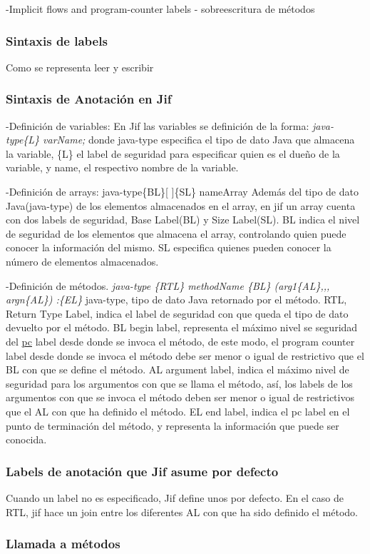 -Implicit flows and program-counter labels\newline
- sobreescritura de métodos

\subsubsection{Sintaxis de labels}
Como se representa leer y escribir

\subsubsection{Sintaxis de Anotación en Jif}
\label{subsec:JifSintax}

-Definición de variables: \newline 
En Jif las variables se definición de la forma: 
\emph{ java-type\{L\} varName; }\newline 
donde java-type especifica el tipo de dato Java que
almacena la variable, \{L\} el label de seguridad  para especificar quien es el
dueño de la variable, y name, el respectivo nombre de la variable.

-Definición de arrays:\newline
java-type\{BL\}[ ]\{SL\} nameArray\newline
Además del tipo de dato Java(java-type) de los elementos almacenados en el
array,  en jif un array cuenta con dos labels de seguridad, Base Label(BL) y
Size Label(SL). BL indica el nivel de seguridad de los elementos que almacena el
array, controlando quien puede conocer la información del mismo. SL especifica
quienes pueden conocer la número de elementos almacenados.

-Definición de métodos.\newline
\emph{ java-type \{RTL\} methodName \{BL\} (arg1\{AL\},,, argn\{AL\}) :\{EL\}
}\newline    
java-type, tipo de dato Java retornado por el método.\newline  
RTL, Return Type Label, indica el label de seguridad con que
queda el tipo de dato devuelto por el método.\newline 
BL begin label, representa el máximo nivel se seguridad del \underline{pc} label
desde donde se invoca el método, de este modo, el program counter label desde donde
se invoca el método debe ser menor o igual de restrictivo que el BL con
que se define el método.\newline 
AL argument label, indica el máximo nivel de
seguridad para los argumentos con que se llama el método, así, los labels de los argumentos con que se invoca el
método deben ser menor o igual de restrictivos que el AL con que ha
definido el método.\newline
EL end label, indica el pc label en el punto de terminación del método, y
representa la información que puede ser conocida.

\subsubsection{Labels de anotación que Jif asume por defecto}
Cuando un label no es especificado, Jif define unos por defecto. 
En el caso de
RTL, jif hace un join entre los diferentes AL con que ha sido definido el
método.

\subsubsection{Llamada a métodos}